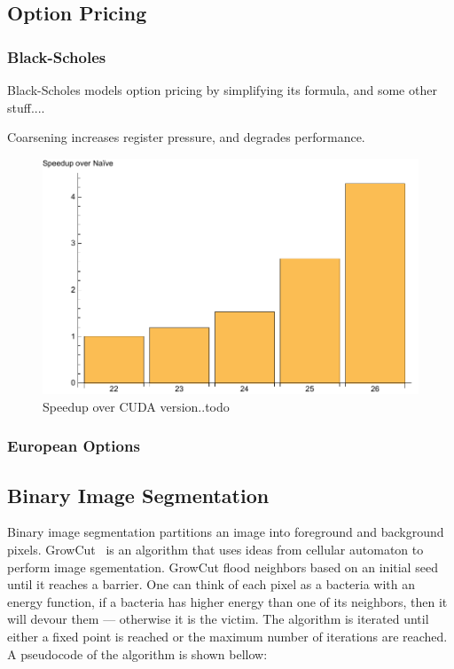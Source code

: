 \subsection{Option Pricing}

\subsubsection{Black-Scholes}
Black-Scholes models option pricing by simplifying its formula, and some other stuff....


Coarsening increases register pressure, and degrades performance.


\begin{figure}
\centering
\includegraphics[scale=0.5]{data/blackscholes.pdf}
\caption{Speedup over CUDA version..todo}
\label{fig:blackscholes}
\centering
\end{figure}


\subsubsection{European Options}

\subsection{Binary Image Segmentation}

Binary image segmentation partitions an image into foreground and background
  pixels.
GrowCut~\cite{vezhnevets2005growcut} is an algorithm that uses ideas from cellular automaton to perform image
  sgementation.
GrowCut flood
  neighbors based on an initial seed until it reaches a barrier.
One can think of each pixel as a bacteria with an energy function, if a bacteria has
  higher energy than one of its neighbors, then it will devour them --- otherwise it
  is the victim.
The algorithm is iterated until either a fixed point is reached or the maximum number
  of iterations are reached.
A pseudocode of the algorithm is shown bellow:

